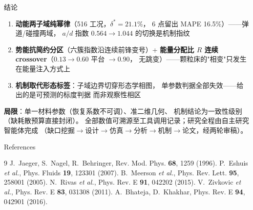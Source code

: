 \documentclass[aspectratio=169,10pt]{beamer}
\newcommand{\pos}[1]{\textcolor{positive}{#1}}
\newcommand{\HL}[1]{\textcolor{emphasis}{#1}}
\begin{document}
\begin{frame}{结论}
\begin{enumerate}
\item \textbf{动能两子域纯幂律}（516 工况，$\delta^*=21.1\%$，
      6 点留出 MAPE \pos{16.5\%}）——弹道/碰撞两域，
      $a/d$ 指数 $0.564\to1.044$ 的切换是机制指纹
\item \textbf{势能抗简约分区}（六簇指数沿连续前锋变号）+
      \textbf{能量分配比 $R$ 连续 crossover}（$0.13\to0.60$ 平台 $\to0.90$，
      无跳变）——颗粒床的"相变"只发生在能量注入方式上
\item \textbf{机制取代形态标签}：子域边界切穿形态学相图，
      单参数判据全部失效——给出的是\HL{可预测的标度判据}
      而非观察性相区
\end{enumerate}
\medskip
\textbf{局限}：单一材料参数（恢复系数不可调）、准二维几何、
机制结论为一致性级别（缺耗散预算直接封闭）。
\medskip
{\small 全部数值可溯源至工具调用记录；研究全程由自主研究智能体完成
（缺口挖掘$\to$设计$\to$仿真$\to$分析$\to$机制$\to$论文，经两轮审稿）。}
\end{frame}

\begin{frame}{References}
\small
\begin{thebibliography}{9}
 J.~Jaeger, S.~Nagel, R.~Behringer, Rev. Mod. Phys. \textbf{68}, 1259 (1996).
 P.~Eshuis \emph{et al.}, Phys. Fluids \textbf{19}, 123301 (2007).
 B.~Meerson \emph{et al.}, Phys. Rev. Lett. \textbf{95}, 258001 (2005).
 N.~Rivas \emph{et al.}, Phys. Rev. E \textbf{91}, 042202 (2015).
 V.~Zivkovic \emph{et al.}, Phys. Rev. E \textbf{83}, 031308 (2011).
 A.~Bhateja, D.~Khakhar, Phys. Rev. E \textbf{94}, 042901 (2016).
\end{thebibliography}
\end{frame}
\end{document}
